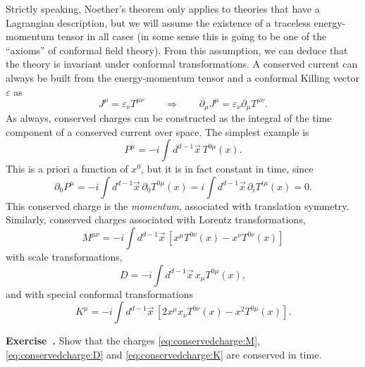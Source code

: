 \documentclass[a4paper,12pt]{article}
\numberwithin{equation}{section}
\newcounter{exercise}[section]
\newenvironment{exercise}[1][]%
	{\refstepcounter{exercise}\bigskip
	\begin{mdframed}[backgroundcolor=gray!20, linewidth=0]
	\noindent\textbf{Exercise~\thesection.\theexercise #1} \rmfamily}
  	{\end{mdframed}\bigskip}
\begin{document}
Strictly speaking, Noether's theorem only applies to theories that have a Lagrangian description, but we will assume the existence of a traceless energy-momentum tensor in all cases (in some sense this is going to be one of the ``axioms'' of conformal field theory).
From this assumption, we can deduce that the theory is invariant under conformal transformations. A conserved current can always be built from the energy-momentum tensor and a conformal Killing vector $\varepsilon$ as
\begin{equation}
	J^\mu = \varepsilon_\nu T^{\mu\nu}
	\qquad\Rightarrow\qquad
	\partial_\mu J^\mu
	= \varepsilon_\nu \partial_\mu T^{\mu\nu}.
\end{equation}
As always, conserved charges can be constructed as the integral of the time component of a conserved current over space. The simplest example is 
\begin{equation}
	P^\mu = -i \int d^{d-1}\vec{x}\, T^{0\mu}(x).
	\label{eq:conservedcharge:P}
\end{equation}
This is a priori a function of $x^0$, but it is in fact constant in time, since
\begin{equation}
	\partial_0 P^\mu
	= -i \int d^{d-1}\vec{x}\, \partial_0 T^{0\mu}(x)
	= i \int d^{d-1}\vec{x}\, \partial_i T^{i\mu}(x) = 0.
\end{equation}
This conserved charge is the \emph{momentum}, associated with translation symmetry. Similarly, conserved charges associated with Lorentz transformations,
\begin{equation}
	M^{\mu\nu} = -i \int d^{d-1}\vec{x}\, \left[
	x^\mu T^{0\nu}(x) - x^\nu T^{0\nu}(x) \right]
	\label{eq:conservedcharge:M}
\end{equation}
with scale transformations,
\begin{equation}
	D = -i \int d^{d-1}\vec{x}\, x_\mu T^{0\mu}(x),
	\label{eq:conservedcharge:D}
\end{equation}
and with special conformal transformations
\begin{equation}
	K^\mu = -i \int d^{d-1}\vec{x} \,
	\left[ 2 x^\mu x_\nu T^{0\nu}(x) - x^2 T^{0\mu}(x) \right].
	\label{eq:conservedcharge:K}
\end{equation}
%
\begin{exercise}
	Show that the charges \eqref{eq:conservedcharge:M},
	\eqref{eq:conservedcharge:D} and \eqref{eq:conservedcharge:K}
	are conserved in time.
\end{exercise}
\end{document}
